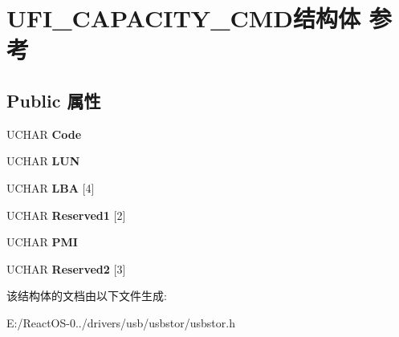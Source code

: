 \hypertarget{struct_u_f_i___c_a_p_a_c_i_t_y___c_m_d}{}\section{U\+F\+I\+\_\+\+C\+A\+P\+A\+C\+I\+T\+Y\+\_\+\+C\+M\+D结构体 参考}
\label{struct_u_f_i___c_a_p_a_c_i_t_y___c_m_d}
\subsection*{Public 属性}
\begin{DoxyCompactItemize}
\item 
\mbox{\label{struct_u_f_i___c_a_p_a_c_i_t_y___c_m_d_ad353b77780486f2ee323c3eabe2060f7}} 
U\+C\+H\+AR {\bfseries Code}
\item 
\mbox{\label{struct_u_f_i___c_a_p_a_c_i_t_y___c_m_d_a8b8d810875a5059ef5f0e5ccdc9cef61}} 
U\+C\+H\+AR {\bfseries L\+UN}
\item 
\mbox{\label{struct_u_f_i___c_a_p_a_c_i_t_y___c_m_d_aaaadb3e07cdfab3fa91999b491f75301}} 
U\+C\+H\+AR {\bfseries L\+BA} \mbox{[}4\mbox{]}
\item 
\mbox{\label{struct_u_f_i___c_a_p_a_c_i_t_y___c_m_d_ae5fa7734ef98cf7273aba80f3550ac8c}} 
U\+C\+H\+AR {\bfseries Reserved1} \mbox{[}2\mbox{]}
\item 
\mbox{\label{struct_u_f_i___c_a_p_a_c_i_t_y___c_m_d_ae3e5ab256617272aacb32bfaf357e9c4}} 
U\+C\+H\+AR {\bfseries P\+MI}
\item 
\mbox{\label{struct_u_f_i___c_a_p_a_c_i_t_y___c_m_d_ac061e7bbe48c933b406804d01d521be1}} 
U\+C\+H\+AR {\bfseries Reserved2} \mbox{[}3\mbox{]}
\end{DoxyCompactItemize}


该结构体的文档由以下文件生成\+:\begin{DoxyCompactItemize}
\item 
E\+:/\+React\+O\+S-\/0../drivers/usb/usbstor/usbstor.\+h\end{DoxyCompactItemize}
